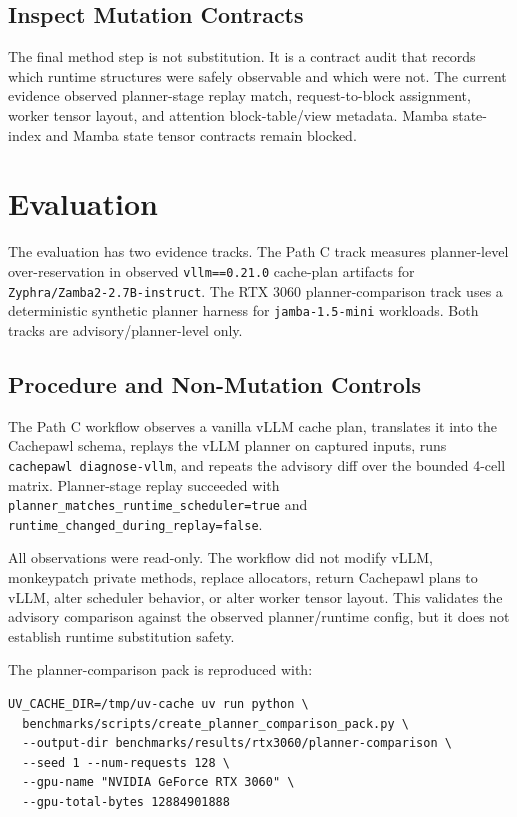 \documentclass[11pt]{article}
\begin{document}
\subsection{Inspect Mutation Contracts}

The final method step is not substitution. It is a contract audit that records
which runtime structures were safely observable and which were not. The current
evidence observed planner-stage replay match, request-to-block assignment,
worker tensor layout, and attention block-table/view metadata. Mamba
state-index and Mamba state tensor contracts remain blocked.

\section{Evaluation}

The evaluation has two evidence tracks. The Path C track measures
planner-level over-reservation in observed \texttt{vllm==0.21.0} cache-plan
artifacts for \texttt{Zyphra/Zamba2-2.7B-instruct}. The RTX 3060
planner-comparison track uses a deterministic synthetic planner harness for
\texttt{jamba-1.5-mini} workloads. Both tracks are advisory/planner-level only.

\subsection{Procedure and Non-Mutation Controls}

The Path C workflow observes a vanilla vLLM cache plan, translates it into the
Cachepawl schema, replays the vLLM planner on captured inputs, runs
\texttt{cachepawl diagnose-vllm}, and repeats the advisory diff over the
bounded 4-cell matrix. Planner-stage replay succeeded with
\texttt{planner\_matches\_runtime\_scheduler=true} and
\texttt{runtime\_changed\_during\_replay=false}.

All observations were read-only. The workflow did not modify vLLM, monkeypatch
private methods, replace allocators, return Cachepawl plans to vLLM, alter
scheduler behavior, or alter worker tensor layout. This validates the advisory
comparison against the observed planner/runtime config, but it does not
establish runtime substitution safety.

The planner-comparison pack is reproduced with:

\begin{verbatim}
UV_CACHE_DIR=/tmp/uv-cache uv run python \
  benchmarks/scripts/create_planner_comparison_pack.py \
  --output-dir benchmarks/results/rtx3060/planner-comparison \
  --seed 1 --num-requests 128 \
  --gpu-name "NVIDIA GeForce RTX 3060" \
  --gpu-total-bytes 12884901888
\end{verbatim}
\end{document}
